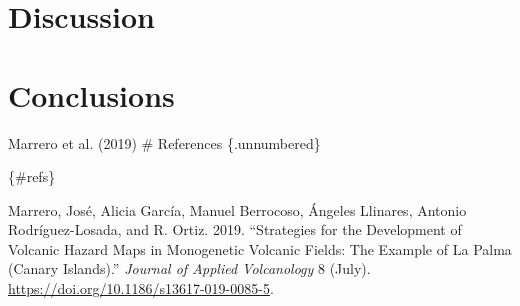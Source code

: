 \documentclass[
  letterpaper,
  DIV=11,
  numbers=noendperiod]{scrartcl}
\newlength{\cslhangindent}
\newenvironment{CSLReferences}[2] %
 {\begin{list}{}{%
  \setlength{\itemindent}{0pt}
  \setlength{\leftmargin}{0pt}
  \setlength{\parsep}{0pt}
  \ifodd #1
   \setlength{\leftmargin}{\cslhangindent}
   \setlength{\itemindent}{-1\cslhangindent}
  \fi
  \setlength{\itemsep}{#2\baselineskip}}}
 {\end{list}}
\begin{document}
\section{Discussion}\label{sec-discussion}

\section{Conclusions}\label{sec-conclusions}

Marrero et al. (2019) \# References \{.unnumbered\}

\{\#refs\}

\label{refs}
\begin{CSLReferences}{1}{0}
Marrero, José, Alicia García, Manuel Berrocoso, Ángeles Llinares,
Antonio Rodríguez-Losada, and R. Ortiz. 2019. {``Strategies for the
Development of Volcanic Hazard Maps in Monogenetic Volcanic Fields: The
Example of {La} {Palma} ({Canary} {Islands}).''} \emph{Journal of
Applied Volcanology} 8 (July).
\url{https://doi.org/10.1186/s13617-019-0085-5}.

\end{CSLReferences}
\end{document}
